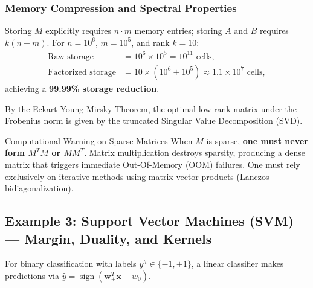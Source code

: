 \subsubsection{Memory Compression and Spectral Properties}
Storing $M$ explicitly requires $n \cdot m$ memory entries; storing $A$ and $B$ requires $k(n + m)$. For $n = 10^6$, $m = 10^5$, and rank $k = 10$:
\begin{align}
    \text{Raw storage} &= 10^6 \times 10^5 = 10^{11} \text{ cells}, \\
    \text{Factorized storage} &= 10 \times (10^6 + 10^5) \approx 1.1 \times 10^7 \text{ cells},
\end{align}
achieving a \textbf{99.99\% storage reduction}.

By the Eckart-Young-Mirsky Theorem, the optimal low-rank matrix under the Frobenius norm is given by the truncated Singular Value Decomposition (SVD).

\begin{alertblock}{Computational Warning on Sparse Matrices}
When $M$ is sparse, \textbf{one must never form $M^T M$ or $M M^T$}. Matrix multiplication destroys sparsity, producing a dense matrix that triggers immediate Out-Of-Memory (OOM) failures. One must rely exclusively on iterative methods using matrix-vector products (Lanczos bidiagonalization).
\end{alertblock}

\subsection{Example 3: Support Vector Machines (SVM) --- Margin, Duality, and Kernels}
For binary classification with labels $y^h \in \{-1, +1\}$, a linear classifier makes predictions via $\hat{y} = \operatorname{sign}(\mathbf{w}_+^T \mathbf{x} - w_0)$.


